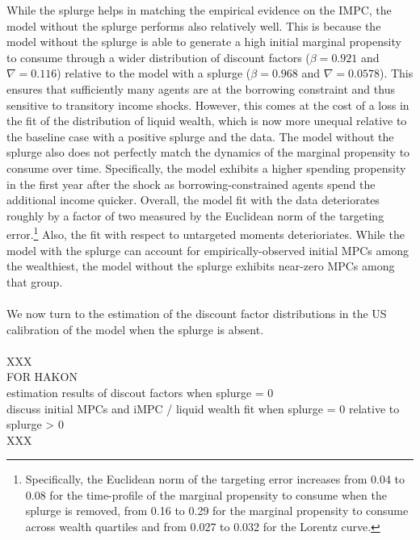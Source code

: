 \documentclass[\econtexRoot/HAFiscal]{subfiles}
\begin{document}
While the splurge helps in matching the empirical evidence on the IMPC, the model without the splurge performs also relatively well. This is because the model without the splurge is able to generate a high initial marginal propensity to consume through a wider distribution of discount factors ($\beta = 0.921$ and $\nabla=0.116$) relative to the model with a splurge ($\beta = 0.968$ and $\nabla=0.0578$). This ensures that sufficiently many agents are at the borrowing constraint and thus sensitive to transitory income shocks. However, this comes at the cost of a loss in the fit of the distribution of liquid wealth, which is now more unequal relative to the baseline case with a positive splurge and the data. The model without the splurge also does not perfectly match the dynamics of the marginal propensity to consume over time. Specifically, the model exhibits a higher spending propensity in the first year after the shock as borrowing-constrained agents spend the additional income quicker. Overall, the model fit with the data deteriorates roughly by a factor of two measured by the Euclidean norm of the targeting error.\footnote{Specifically, the Euclidean norm of the targeting error increases from 0.04 to 0.08 for the time-profile of the marginal propensity to consume when the splurge is removed, from 0.16 to 0.29 for the marginal propensity to consume across wealth quartiles and from 0.027 to 0.032 for the Lorentz curve.} Also, the fit with respect to untargeted moments deterioriates. While the model with the splurge can account for empirically-observed initial MPCs among the wealthiest, the model without the splurge exhibits near-zero MPCs among that group.\\
\\
We now turn to the estimation of the discount factor distributions in the US calibration of the model when the splurge is absent. \\
\\
XXX\\
FOR HAKON\\
estimation results of discout factors when splurge = 0\\
discuss initial MPCs and iMPC / liquid wealth fit when splurge = 0 relative to splurge > 0\\
XXX\\
\end{document}
